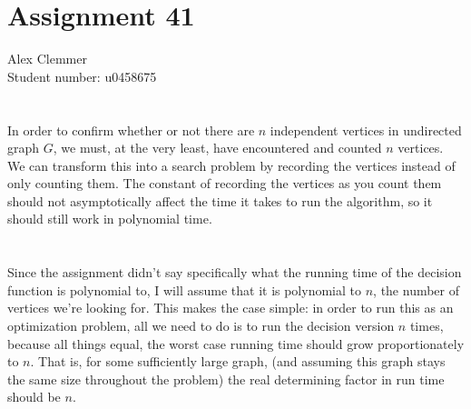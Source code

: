 \documentclass[a4paper]{article}
\begin{document}
\section*{Assignment 41}
Alex Clemmer\\
Student number: u0458675

\section{}

In order to confirm whether or not there are $n$ independent vertices in undirected graph $G$, we must, at the very least, have encountered and counted $n$ vertices. We can transform this into a search problem by recording the vertices instead of only counting them. The constant of recording the vertices as you count them should not asymptotically affect the time it takes to run the algorithm, so it should still work in polynomial time.

\section{}

Since the assignment didn't say specifically what the running time of the decision function is polynomial to, I will assume that it is polynomial to $n$, the number of vertices we're looking for. This makes the case simple: in order to run this as an optimization problem, all we need to do is to run the decision version $n$ times, because all things equal, the worst case running time should grow proportionately to $n$. That is, for some sufficiently large graph, (and assuming this graph stays the same size throughout the problem) the real determining factor in run time should be $n$.
\end{document}
